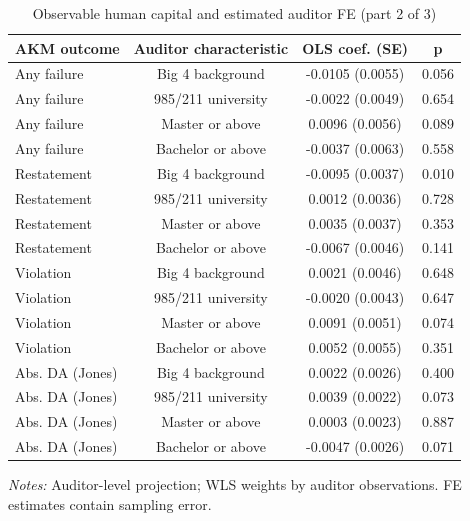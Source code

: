 \begin{table}[htbp]
\footnotesize
\centering
\caption{Observable human capital and estimated auditor FE (part 2 of 3)}
\begin{threeparttable}
\begin{tabular}{p{}ccc}
\toprule
AKM outcome & Auditor characteristic & OLS coef. (SE) & p \\
\midrule
Any failure & Big 4 background & -0.0105 (0.0055) & 0.056 \\
Any failure & 985/211 university & -0.0022 (0.0049) & 0.654 \\
Any failure & Master or above & 0.0096 (0.0056) & 0.089 \\
Any failure & Bachelor or above & -0.0037 (0.0063) & 0.558 \\
Restatement & Big 4 background & -0.0095 (0.0037) & 0.010 \\
Restatement & 985/211 university & 0.0012 (0.0036) & 0.728 \\
Restatement & Master or above & 0.0035 (0.0037) & 0.353 \\
Restatement & Bachelor or above & -0.0067 (0.0046) & 0.141 \\
Violation & Big 4 background & 0.0021 (0.0046) & 0.648 \\
Violation & 985/211 university & -0.0020 (0.0043) & 0.647 \\
Violation & Master or above & 0.0091 (0.0051) & 0.074 \\
Violation & Bachelor or above & 0.0052 (0.0055) & 0.351 \\
Abs. DA (Jones) & Big 4 background & 0.0022 (0.0026) & 0.400 \\
Abs. DA (Jones) & 985/211 university & 0.0039 (0.0022) & 0.073 \\
Abs. DA (Jones) & Master or above & 0.0003 (0.0023) & 0.887 \\
Abs. DA (Jones) & Bachelor or above & -0.0047 (0.0026) & 0.071 \\
\bottomrule
\end{tabular}
\begin{tablenotes}\footnotesize
\item \raggedright \textit{Notes:} Auditor-level projection; WLS weights by auditor observations. FE estimates contain sampling error.
\end{tablenotes}
\end{threeparttable}
\end{table}


